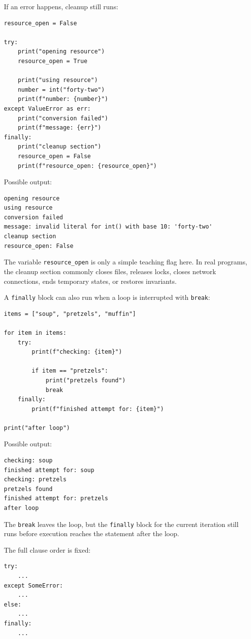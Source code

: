 If an error happens, cleanup still runs:

\begin{verbatim}
resource_open = False

try:
    print("opening resource")
    resource_open = True

    print("using resource")
    number = int("forty-two")
    print(f"number: {number}")
except ValueError as err:
    print("conversion failed")
    print(f"message: {err}")
finally:
    print("cleanup section")
    resource_open = False
    print(f"resource_open: {resource_open}")
\end{verbatim}

Possible output:

\begin{verbatim}
opening resource
using resource
conversion failed
message: invalid literal for int() with base 10: 'forty-two'
cleanup section
resource_open: False
\end{verbatim}

The variable \texttt{resource\_open} is only a simple teaching flag here. In real programs, the cleanup section commonly closes files, releases locks, closes network connections, ends temporary states, or restores invariants.

A \texttt{finally} block can also run when a loop is interrupted with \texttt{break}:

\begin{verbatim}
items = ["soup", "pretzels", "muffin"]

for item in items:
    try:
        print(f"checking: {item}")

        if item == "pretzels":
            print("pretzels found")
            break
    finally:
        print(f"finished attempt for: {item}")

print("after loop")
\end{verbatim}

Possible output:

\begin{verbatim}
checking: soup
finished attempt for: soup
checking: pretzels
pretzels found
finished attempt for: pretzels
after loop
\end{verbatim}

The \texttt{break} leaves the loop, but the \texttt{finally} block for the current iteration still runs before execution reaches the statement after the loop.

The full clause order is fixed:

\begin{verbatim}
try:
    ...
except SomeError:
    ...
else:
    ...
finally:
    ...
\end{verbatim}


